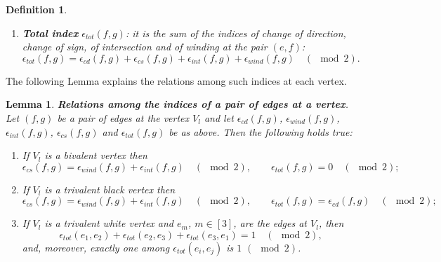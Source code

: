\documentclass[11pt]{amsart}
\theoremstyle{plain}
\numberwithin{equation}{section}
\newtheorem{lemma}[theorem]{Lemma}
\newtheorem{definition}{Definition}[subsection]
\begin{document}
\begin{definition}
\begin{enumerate}
\[\begin{array}{ll}
-\mbox{wind} (g,f) & \mbox{if $g$ points inwards and $f$ outwards at } V_l,\\
\mbox{wind} (h,g) -\mbox{wind} (h,f)& \mbox{if } \epsilon_{cd}(f,g)=1 \mbox{ and }  h \mbox{ is the third edge at } V_l.\\
\end{array}\right.
\]
\item \textbf{Total index} $\epsilon_{tot} (f,g)$: it is the sum of the indices of change of direction, change of sign, of intersection and of winding at the pair $(e,f)$:
\begin{equation}\label{eq:tot}
\epsilon_{tot} (f,g) = \epsilon_{cd}(f,g)+\epsilon_{cs}(f,g)+\epsilon_{int}(f,g)+\epsilon_{wind}(f,g)    \quad
(\!\!\!\!\!\!\mod 2).
\end{equation}
\end{enumerate}
\end{definition}

The following Lemma explains the relations among such indices at each vertex.

\begin{lemma}\label{lemma:count_eps}\textbf{Relations among the indices of a pair of edges at a vertex}.
Let $(f,g)$ be a pair of edges at the vertex $V_l$ and let $\epsilon_{cd} (f,g)$, $\epsilon_{wind} (f,g)$, $\epsilon_{int} (f,g)$, $\epsilon_{cs} (f,g)$ and  $\epsilon_{tot} (f,g) $ be as above.
Then the following holds true:
\begin{enumerate}
\item If $V_l$ is a bivalent vertex then 
\begin{equation}\label{eq:tot_biv}
\epsilon_{cs} (f,g) = \epsilon_{wind} (f,g)+\epsilon_{int} (f,g) \quad
(\!\!\!\!\!\!\mod 2),\quad\quad \epsilon_{tot} (f,g) = 0 \quad
(\!\!\!\!\!\!\mod 2);
\end{equation}
\item If $V_l$ is a trivalent black vertex then 
\begin{equation}\label{eq:tot_triv_bl}
\epsilon_{cs} (f,g) = \epsilon_{wind} (f,g)+\epsilon_{int} (f,g) \quad
(\!\!\!\!\!\!\mod 2),\quad\quad \epsilon_{tot} (f,g) = \epsilon_{cd} (f,g) \quad
(\!\!\!\!\!\!\mod 2);
\end{equation}
\item If $V_l$ is a trivalent white vertex and $e_m$, $m\in [3]$, are the edges at $V_l$, then
\begin{equation}\label{eq:tot_triv_wh}
\epsilon_{tot} (e_1,e_2) +\epsilon_{tot} (e_2,e_3)+\epsilon_{tot} (e_3,e_1) = 1 \quad
(\!\!\!\!\!\!\mod 2),
\end{equation}
and, moreover, exactly one among $\epsilon_{tot}(e_i,e_j)$ is $1 \,\,
(\!\!\!\!\mod 2)$.
\end{enumerate}
\end{lemma}
\end{document}
